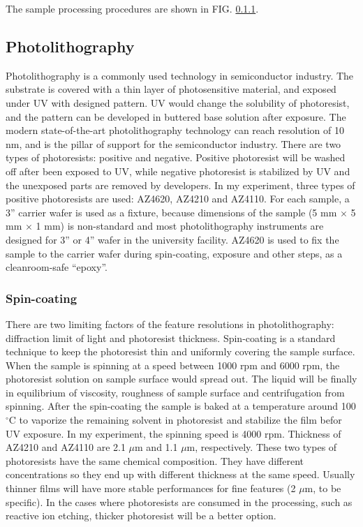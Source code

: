 \documentclass[pdftex, sectionletters]{pittetd}    %
\begin{document}
The sample processing procedures are shown in FIG. \ref{}. 


\subsection{Photolithography}

Photolithography is a commonly used technology in semiconductor industry. The substrate is covered with a thin layer of photosensitive material, and exposed under UV with designed pattern. UV would change the solubility of photoresist, and the pattern can be developed in buttered base solution after exposure. The modern state-of-the-art photolithography technology can reach resolution of 10 nm, and is the pillar of support for the semiconductor industry. There are two types of photoresists: positive and negative. Positive photoresist will be washed off after been exposed to UV, while negative photoresist is stabilized by UV and the unexposed parts are removed by developers. In my experiment, three types of positive photoresists are used: AZ4620, AZ4210 and AZ4110. For each sample, a 3'' carrier wafer is used as a fixture, because dimensions of the sample (5 mm $\times$ 5 mm $\times$ 1 mm) is non-standard and most photolithography instruments are designed for 3'' or 4'' wafer in the university facility. AZ4620 is used to fix the sample to the carrier wafer during spin-coating, exposure and other steps, as a cleanroom-safe ``epoxy''. 


\subsubsection{Spin-coating}

There are two limiting factors of the feature resolutions in photolithography: diffraction limit of light and photoresist thickness. Spin-coating is a standard technique to keep the photoresist thin and uniformly covering the sample surface. When the sample is spinning at a speed between 1000 rpm and 6000 rpm, the photoresist solution on sample surface would spread out. The liquid will be finally in equilibrium of viscosity, roughness of sample surface and centrifugation from spinning. After the spin-coating the sample is baked at a temperature around 100$^{\circ}$C to vaporize the remaining solvent in photoresist and stabilize the film befor UV exposure. In my experiment, the spinning speed is 4000 rpm. Thickness of AZ4210 and AZ4110 are 2.1 $\mu$m and 1.1 $\mu$m, respectively. These two types of photoresists have the same chemical composition. They have different concentrations so they end up with different thickness at the same speed. Usually thinner films will have more stable performances for fine features (2 $\mu$m, to be specific). In the cases where photoresists are consumed in the processing, such as reactive ion etching, thicker photoresist will be a better option.
\end{document}
